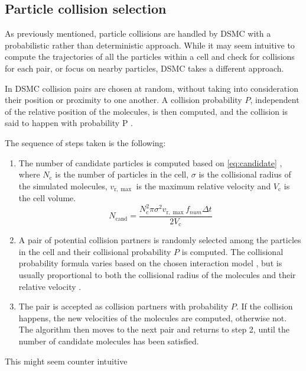 \subsection{Particle collision selection}
\label{subsection:collision}

As previously mentioned, particle collisions are handled by DSMC with a probabilistic rather than deterministic approach. While it may seem intuitive to compute the trajectories of all the particles within a cell and check for collisions for each pair, or focus on nearby particles, DSMC takes a different approach.

In DSMC collision pairs are chosen at random, without taking into consideration their position or proximity to one another. A collision probability $P$, independent of the relative position of the molecules, is then computed, and the collision is said to happen with probability P \cite{bird, themontecarlo, natodsmc}.

The sequence of steps taken is the following:
\begin{enumerate}
    \item The number of candidate particles is computed based on \autoref{eq:candidate} \cite{themontecarlo}, where $N_{\mathrm{c}}$ is the number of particles in the cell, $\sigma$ is the collisional radius of the simulated molecules, $v_{\mathrm{r}, \max }$ is the maximum relative velocity and $V_{\mathrm{c}}$ is the cell volume.
    \begin{equation}
        N_{\mathrm{cand}}=\frac{N_{\mathrm{c}}^2 \pi \sigma^2 v_{\mathrm{r}, \max } f_{num} \Delta t}{2 V_{\mathrm{c}}}
        \label{eq:candidate}
    \end{equation}
    \item A pair of potential collision partners is randomly selected among the particles in the cell and their collisional probability $P$ is computed. The collisional probability formula varies based on the chosen interaction model \cite{natodsmc}, but is usually proportional to both the collisional radius of the molecules and their relative velocity \cite{bird}.
    \item The pair is accepted as collision partners with probability $P$. If the collision happens, the new velocities of the molecules are computed, otherwise not. The algorithm then moves to the next pair and returns to step 2, until the number of candidate molecules has been satisfied.
\end{enumerate}


This might seem counter intuitive


